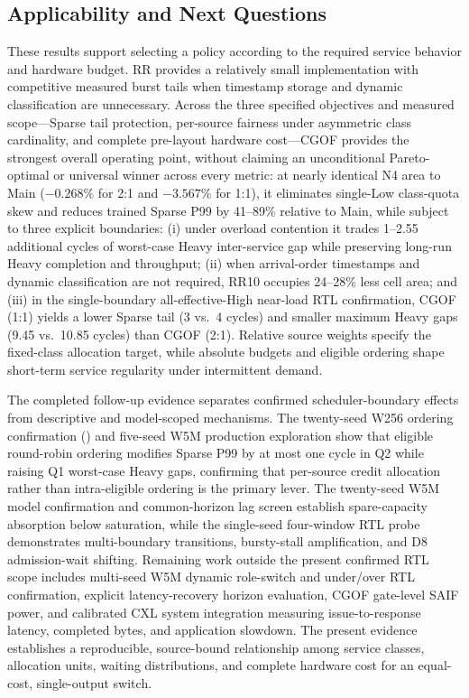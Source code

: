 \subsection{Applicability and Next Questions}
These results support selecting a policy according to the required service behavior and hardware budget. RR provides a relatively small implementation with competitive measured burst tails when timestamp storage and dynamic classification are unnecessary. Across the three specified objectives and measured scope—Sparse tail protection, per-source fairness under asymmetric class cardinality, and complete pre-layout hardware cost—CGOF provides the strongest overall operating point, without claiming an unconditional Pareto-optimal or universal winner across every metric: at nearly identical N4 area to Main ($-0.268\%$ for 2:1 and $-3.567\%$ for 1:1), it eliminates single-Low class-quota skew and reduces trained Sparse P99 by 41--89\% relative to Main, while subject to three explicit boundaries: (i) under overload contention it trades 1--2.55 additional cycles of worst-case Heavy inter-service gap while preserving long-run Heavy completion and throughput; (ii) when arrival-order timestamps and dynamic classification are not required, RR10 occupies 24--28\% less cell area; and (iii) in the single-boundary all-effective-High near-load RTL confirmation, CGOF (1:1) yields a lower Sparse tail (3 vs.\ 4 cycles) and smaller maximum Heavy gaps (9.45 vs.\ 10.85 cycles) than CGOF (2:1). Relative source weights specify the fixed-class allocation target, while absolute budgets and eligible ordering shape short-term service regularity under intermittent demand.

The completed follow-up evidence separates confirmed scheduler-boundary effects from descriptive and model-scoped mechanisms. The twenty-seed W256 ordering confirmation () and five-seed W5M production exploration show that eligible round-robin ordering modifies Sparse P99 by at most one cycle in Q2 while raising Q1 worst-case Heavy gaps, confirming that per-source credit allocation rather than intra-eligible ordering is the primary lever. The twenty-seed W5M model confirmation and common-horizon lag screen establish spare-capacity absorption below saturation, while the single-seed four-window RTL probe demonstrates multi-boundary transitions, bursty-stall amplification, and D8 admission-wait shifting. Remaining work outside the present confirmed RTL scope includes multi-seed W5M dynamic role-switch and under/over RTL confirmation, explicit latency-recovery horizon evaluation, CGOF gate-level SAIF power, and calibrated CXL system integration measuring issue-to-response latency, completed bytes, and application slowdown. The present evidence establishes a reproducible, source-bound relationship among service classes, allocation units, waiting distributions, and complete hardware cost for an equal-cost, single-output switch.

